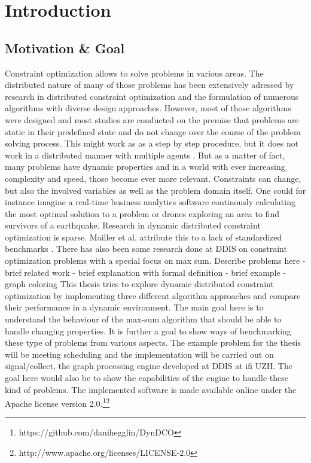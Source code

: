 \chapter{Introduction}

\section{Motivation \& Goal}
Constraint optimization allows to solve problems in various areas. The distributed nature of  many of those problems has been extensively adressed by research in distributed constraint optimization and the formulation of numerous algorithms with diverse design approaches. However, most of those algorithms were designed and most studies are conducted on the premise that problems are static in their predefined state and do not change over the course of the problem solving process. This might work as as a step by step procedure, but it does not work in a distributed manner with multiple agents \cite{Petcu2007}. But as a matter of fact, many problems have dynamic properties and in a world with ever increasing complexity and speed, those become ever more relevant. Constraints can change, but also the involved variables as well as the problem domain itself. One could for instance imagine a real-time business analytics software continously calculating the most optimal solution to a problem or drones exploring an area to find survivors of a earthquake. Research in dynamic distributed constraint optimization is sparse. Mailler et al. attribute this to a lack of standardized benchmarks \cite{Mailler2014}. There has also been some research done at DDIS on constraint optimization problems with a special focus on max sum.
\newline \newline
Describe problems here
    - brief related work
    - brief explanation with formal definition
    - brief example
    - graph coloring
\newline \newline
This thesis tries to explore dynamic distributed constraint optimization by implementing three different algorithm approaches and compare their performance in a dynamic environment. The main goal here is to understand the behaviour of the max-sum algorithm that should be able to handle changing properties. It is further a goal to show ways of benchmarking these type of problems from various aspects. The example problem for the thesis will be meeting scheduling and the implementation will be carried out on signal/collect, the graph processing engine developed at  DDIS at ifi UZH. The goal here would also be to show the capabilities of the engine to handle these kind of problems. 
\newline \newline
The implemented software is made available online under the Apache license version 2.0.\footnote{https://github.com/danihegglin/DynDCO}\footnote{http://www.apache.org/licenses/LICENSE-2.0}

